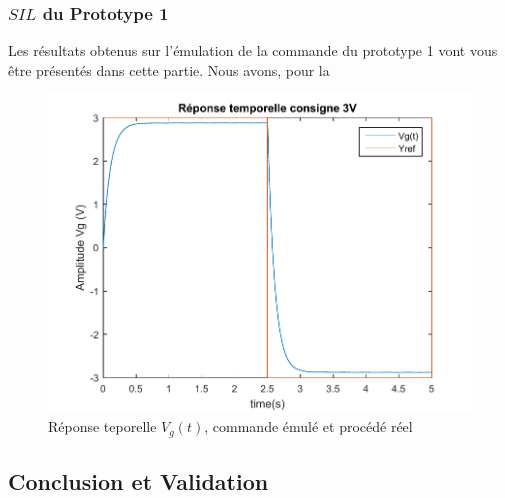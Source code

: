 		\subsubsection{$SIL$ du Prototype 1}		
		Les résultats obtenus sur l'émulation de la commande du prototype 1 vont vous être présentés dans cette partie. Nous avons, pour la 
		\begin{figure}[!ht]
		\centering
		\includegraphics[width = .7\textwidth]{./IV/images/repNL_proto1.pdf}
		\caption{Réponse teporelle $V_g(t)$, commande émulé et procédé réel\label{fig:rep_MoteurReel_proto1}}
\end{figure}				
		\subsection{Conclusion et Validation}
		

